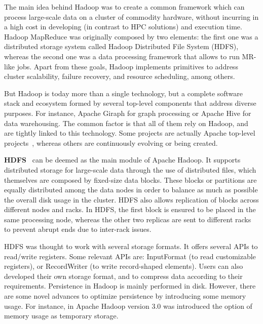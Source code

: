 \documentclass[3p,review]{elsarticle}
\begin{document}
The main idea behind Hadoop was to create a common framework which can process large-scale data on a cluster of commodity hardware, without incurring in a high cost in developing (in contrast to HPC solutions) and execution time. Hadoop MapReduce was originally composed by two elements: the first one was a distributed storage system called Hadoop Distributed File System (HDFS), whereas the second one was a data processing framework that allows to run MR-like jobs. Apart from these goals, Hadoop implements primitives to address cluster scalability, failure recovery, and resource scheduling, among others.

But Hadoop is today more than a single technology, but a complete software stack and ecosystem formed by several top-level components that address diverse purposes. For instance, Apache Giraph for graph processing or Apache Hive for data warehousing. The common factor is that all of them rely on Hadoop, and are tightly linked to this technology. Some projects are actually Apache top-level projects~\cite{apache}, whereas others are continuously evolving or being created.%

\textbf{HDFS}~\cite{hdfs} can be deemed as the main module of Apache Hadoop. It supports distributed storage for large-scale data through the use of distributed files, which themselves are composed by fixed-size data blocks. These blocks or partitions are equally distributed among the data nodes in order to balance as much as possible the overall disk usage in the cluster. HDFS also allows replication of blocks across different nodes and racks. In HDFS, the first block is ensured to be placed in the same processing node, whereas the other two replicas are sent to different racks to prevent abrupt ends due to inter-rack issues. 

HDFS was thought to work with several storage formats. It offers several APIs to read/write registers. Some relevant APIs are: InputFormat (to read customizable registers), or RecordWriter (to write record-shaped elements). Users can also developed their own storage format, and to compress data according to their requirements. Persistence in Hadoop is mainly performed in disk. However, there are some novel advances to optimize persistence by introducing some memory usage. For instance, in Apache Hadoop version 3.0 was introduced the option of memory usage as temporary storage.
\end{document}
